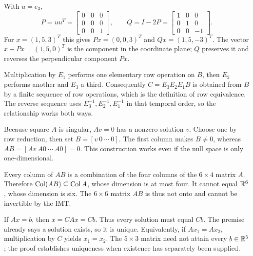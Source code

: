 With $u=e_3$,
\[
 P=uu^T=\begin{bmatrix}0&0&0\\0&0&0\\0&0&1\end{bmatrix},\qquad
 Q=I-2P=\begin{bmatrix}1&0&0\\0&1&0\\0&0&-1\end{bmatrix}.
\]
For $x=(1,5,3)^T$ this gives
$Px=(0,0,3)^T$ and $Qx=(1,5,-3)^T$.
The vector $x-Px=(1,5,0)^T$ is the component in the coordinate plane;
$Q$ preserves it and reverses the perpendicular component $Px$.

Multiplication by $E_1$ performs one elementary row operation on $B$,
then $E_2$ performs another and $E_3$ a third.
Consequently $C=E_3E_2E_1B$ is obtained from $B$ by a finite sequence
of row operations, which is the definition of row equivalence.
The reverse sequence uses $E_3^{-1},E_2^{-1},E_1^{-1}$ in that temporal
order, so the relationship works both ways.

Because square $A$ is singular, $Av=0$ has a nonzero solution $v$.
Choose one by row reduction, then set $B=[v\ 0\ \cdots\ 0]$.
The first column makes $B\ne0$, whereas
$AB=[Av\ A0\ \cdots\ A0]=0$.
This construction works even if the null space is only one-dimensional.

Every column of $AB$ is a combination of the four columns of the
$6\times4$ matrix $A$. Therefore
$\operatorname{Col}(AB)\subseteq\operatorname{Col} A$, whose dimension is at most four.
It cannot equal $\mathbb{R}^6$, whose dimension is six. The $6\times6$ matrix
$AB$ is thus not onto and cannot be invertible by the IMT.

If $Ax=b$, then $x=CAx=Cb$. Thus every solution must equal $Cb$.
The premise already says a solution exists, so it is unique.
Equivalently, if $Ax_1=Ax_2$, multiplication by $C$ yields $x_1=x_2$.
The $5\times3$ matrix need not attain every $b\in\mathbb{R}^5$; the proof
establishes uniqueness when existence has separately been supplied.

